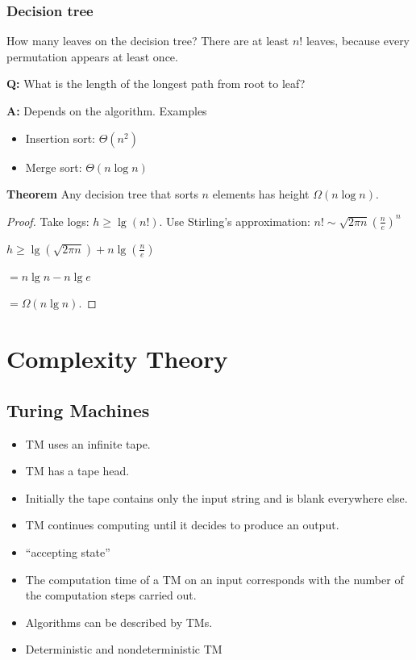 \documentclass[12pt,openany]{book}
\theoremstyle{definition}
\begin{document}
	\subsection{Decision tree}
	How many leaves on the decision tree? There are at least \( n! \) leaves, because every permutation appears at least once.
	
	\textbf{Q:} What is the length of the longest path from root to leaf?
	
	\textbf{A:} Depends on the algorithm. Examples
	\begin{itemize}
		\item Insertion sort: \( \Theta(n^2) \)
		\item Merge sort: \( \Theta(n \log n) \)
	\end{itemize}
	
	
	\textbf{Theorem} Any decision tree that sorts \( n \) elements has height \( \Omega(n \log n) \).
	
	\begin{proof}
		Take logs: \( h \geq \lg(n!) \).
		Use Stirling's approximation: \( n! \sim \sqrt{2\pi n} \left(\frac{n}{e}\right)^n \)
		
		\( h \geq \lg\left(\sqrt{2\pi n}\right) + n\lg\left(\frac{n}{e}\right) \)
		
		\( = n \lg n - n \lg e \)
		
		\( = \Omega(n \lg n) \).
	\end{proof}
	
	\newpage
	\chapter{Complexity Theory}
	
	\section{Turing Machines}
	\begin{itemize}
		\item TM uses an infinite tape.
		\item TM has a tape head.
		\item Initially the tape contains only the input string and is blank everywhere else.
		\item TM continues computing until it decides to produce an output.
		\item ``accepting state''
	\end{itemize}
	
	\begin{itemize}
		\item The computation time of a TM on an input corresponds with the number of the computation steps carried out.
		\item Algorithms can be described by TMs.
		\item Deterministic and nondeterministic TM
	\end{itemize}
	
\end{document}
